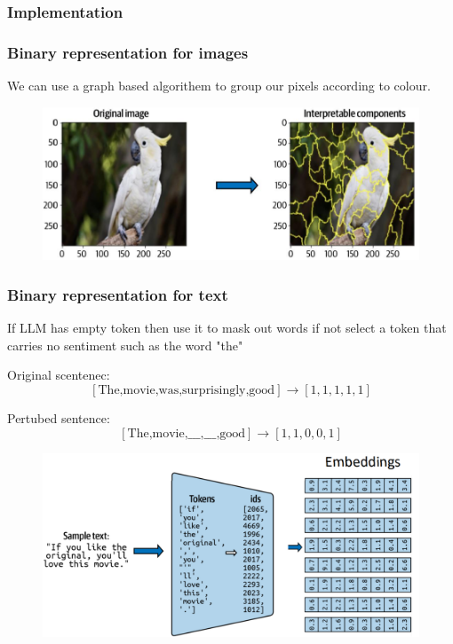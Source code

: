 \subsubsection{Implementation}
\subsubsection*{Binary representation for images}
We can use a graph based algorithem to group our pixels according to colour.
\begin{figure}[!h]
    \includegraphics[width = \columnwidth]{figures/XAI3/BinaryRepImage.png}
\end{figure}

\subsubsection*{Binary representation for text}
If LLM has empty token then use it to mask out words if not select a token that carries no sentiment such as the word "the"

Original scentenec:
\[
\left[
    \text{The,movie,was,surprisingly,good}
\right] \rightarrow \left[1,1,1,1,1\right]
\]

Pertubed sentence:
\[\left[\text{The,movie,\_\_\_,\_\_\_,good}\right] \rightarrow \left[1, 1, 0, 0, 1\right]\]
\begin{figure}[!h]
    \includegraphics[width = \columnwidth]{figures/XAI3/BinaryRepText.png}
\end{figure}

